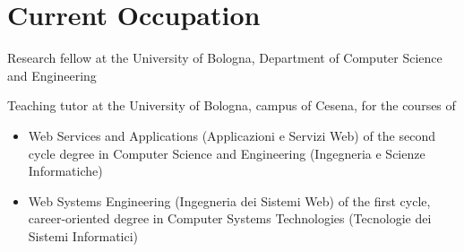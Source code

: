 \section{Current Occupation}

Research fellow at the University of Bologna, Department of Computer Science and Engineering

Teaching tutor at the University of Bologna, campus of Cesena, for the courses of
\begin{itemize}
  \item Web Services and Applications (Applicazioni e Servizi Web) of the second cycle degree in Computer Science and Engineering (Ingegneria e Scienze Informatiche)
  \item Web Systems Engineering (Ingegneria dei Sistemi Web) of the first cycle, career-oriented degree in Computer Systems Technologies (Tecnologie dei Sistemi Informatici)
\end{itemize}

\vspace{20pt}
